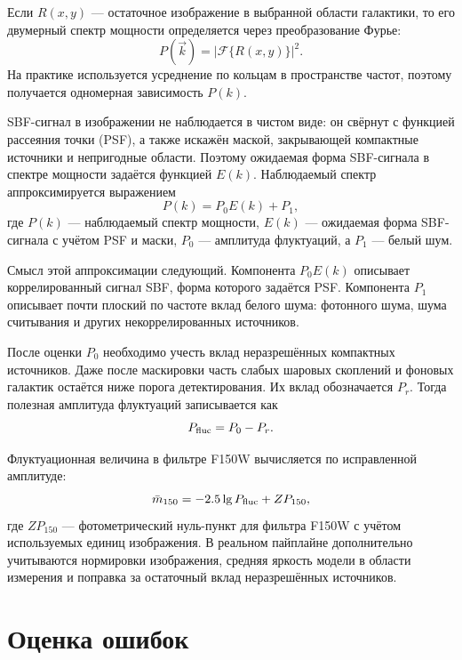 \documentclass[12pt,a4paper]{article}
\begin{document}
Если $R(x,y)$ --- остаточное изображение в выбранной области галактики, то его двумерный спектр мощности определяется через преобразование Фурье:
\begin{equation}
    P(\vec{k}) = \left|\mathcal{F}\{R(x,y)\}\right|^2.
\end{equation}
На практике используется усреднение по кольцам в пространстве частот, поэтому получается одномерная зависимость $P(k)$.

SBF-сигнал в изображении не наблюдается в чистом виде: он свёрнут с функцией рассеяния точки (PSF), а также искажён маской, закрывающей компактные источники и непригодные области. Поэтому ожидаемая форма SBF-сигнала в спектре мощности задаётся функцией $E(k)$. Наблюдаемый спектр аппроксимируется выражением
\begin{equation}
    P(k) = P_0 E(k) + P_1,
\end{equation}
где $P(k)$ --- наблюдаемый спектр мощности, $E(k)$ --- ожидаемая форма SBF-сигнала с учётом PSF и маски, $P_0$ --- амплитуда флуктуаций, а $P_1$ --- белый шум.

Смысл этой аппроксимации следующий. Компонента $P_0E(k)$ описывает коррелированный сигнал SBF, форма которого задаётся PSF. Компонента $P_1$ описывает почти плоский по частоте вклад белого шума: фотонного шума, шума считывания и других некоррелированных источников.

После оценки $P_0$ необходимо учесть вклад неразрешённых компактных источников. Даже после маскировки часть слабых шаровых скоплений и фоновых галактик остаётся ниже порога детектирования. Их вклад обозначается $P_r$. Тогда полезная амплитуда флуктуаций записывается как
\begin{equation}
    P_{\rm fluc} = P_0 - P_r.
\end{equation}

Флуктуационная величина в фильтре F150W вычисляется по исправленной амплитуде:
\begin{equation}
    \bar{m}_{150} = -2.5\lg P_{\rm fluc} + ZP_{150},
\end{equation}
где $ZP_{150}$ --- фотометрический нуль-пункт для фильтра F150W с учётом используемых единиц изображения. В реальном пайплайне дополнительно учитываются нормировки изображения, средняя яркость модели в области измерения и поправка за остаточный вклад неразрешённых источников.

\section{Оценка ошибок}
\end{document}
